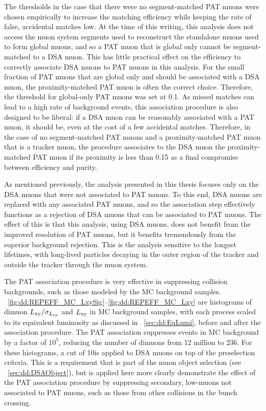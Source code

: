 The \deltaR thresholds in the case that there were no segment-matched PAT muons were chosen empirically to increase the matching efficiency while keeping the rate of false, accidental matches low.
At the time of this writing, this analysis does not access the muon system segments used to reconstruct the standalone muons used to form global muons, and so a PAT muon that is global only cannot be segment-matched to a DSA muon.
This has little practical effect on the efficiency to correctly associate DSA muons to PAT muons in this analysis.
For the small fraction of PAT muons that are global only and should be associated with a DSA muon, the proximity-matched PAT muon is often the correct choice.
Therefore, the \deltaR threshold for global-only PAT muons was set at 0.1.
As missed matches can lead to a high rate of background events, this association procedure is also designed to be liberal: if a DSA muon can be reasonably associated with a PAT muon, it should be, even at the cost of a few accidental matches.
Therefore, in the case of no segment-matched PAT muons and a proximity-matched PAT muon that is a tracker muon, the procedure associates to the DSA muon the proximity-matched PAT muon if its proximity \deltaR is less than 0.15 as a final compromise between efficiency and purity.

As mentioned previously, the analysis presented in this thesis focuses only on the DSA muons that were not associated to PAT muons.
To this end, DSA muons are replaced with any associated PAT muons, and so the association step effectively functions as a rejection of DSA muons that can be associated to PAT muons.
The effect of this is that this analysis, using DSA muons, does not benefit from the improved resolution of PAT muons, but it benefits tremendously from the superior background rejection.
This is the analysis sensitive to the longest lifetimes, with long-lived particles decaying in the outer region of the tracker and outside the tracker through the muon system.

The PAT association procedure is very effective in suppressing \pp collision backgrounds, such as those modeled by the MC background samples.
\Figs~\ref{fig:dd:REPEFF_MC_LxySig}--\ref{fig:dd:REPEFF_MC_Lxy} are histograms of dimuon $L_{\mathrm{xy}}/\sigma_{L_{\mathrm{xy}}}$ and $L_{\mathrm{xy}}$ in MC background samples, with each process scaled to its equivalent luminosity as discussed in \Sec~\ref{sec:dd:EqLumi}, before and after the association procedure.
The PAT association suppresses events in MC background by a factor of $10^5$, reducing the number of dimuons from 12 million to 236.
For these histograms, a \pT cut of 10\GeV is applied to DSA muons on top of the preselection criteria.
This is a requirement that is part of the muon object selection (see \Sec~\ref{sec:dd:DSAObject}), but is applied here more clearly demonstrate the effect of the PAT association procedure by suppressing secondary, low-\pT muons not associated to PAT muons, such as those from other \pp collisions in the bunch crossing.

